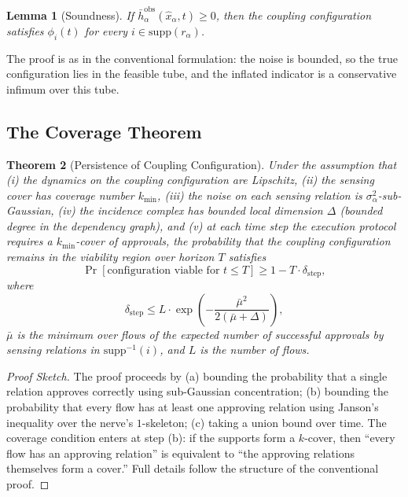 \documentclass[11pt]{article}
\newtheorem{theorem}{Theorem}[section]
\newtheorem{lemma}[theorem]{Lemma}
\theoremstyle{definition}
\theoremstyle{remark}
\begin{document}
\begin{lemma}[Soundness]
\label{lem:soundness}
If $\bar h_\alpha^{\mathrm{obs}}(\hat x_\alpha, t) \geq 0$, then the coupling configuration satisfies $\phi_i(t)$ for every $i \in \mathrm{supp}(r_\alpha)$.
\end{lemma}

The proof is as in the conventional formulation: the noise is bounded, so the true configuration lies in the feasible tube, and the inflated indicator is a conservative infimum over this tube.

\subsection{The Coverage Theorem}

\begin{theorem}[Persistence of Coupling Configuration]
\label{thm:persistence}
Under the assumption that (i) the dynamics on the coupling configuration are Lipschitz, (ii) the sensing cover has coverage number $k_{\min}$, (iii) the noise on each sensing relation is $\sigma_\alpha^2$-sub-Gaussian, (iv) the incidence complex has bounded local dimension $\Delta$ (bounded degree in the dependency graph), and (v) at each time step the execution protocol requires a $k_{\min}$-cover of approvals, the probability that the coupling configuration remains in the viability region over horizon $T$ satisfies
\begin{equation}
\Pr[\text{configuration viable for } t \leq T] \geq 1 - T \cdot \delta_{\mathrm{step}},
\end{equation}
where 
\begin{equation}
\delta_{\mathrm{step}} \leq L \cdot \exp\left(-\frac{\bar\mu^2}{2(\bar\mu + \Delta)}\right),
\end{equation}
$\bar\mu$ is the minimum over flows of the expected number of successful approvals by sensing relations in $\mathrm{supp}^{-1}(i)$, and $L$ is the number of flows.
\end{theorem}

\begin{proof}[Proof Sketch]
The proof proceeds by (a) bounding the probability that a single relation approves correctly using sub-Gaussian concentration; (b) bounding the probability that every flow has at least one approving relation using Janson's inequality over the nerve's $1$-skeleton; (c) taking a union bound over time. The coverage condition enters at step (b): if the supports form a $k$-cover, then ``every flow has an approving relation'' is equivalent to ``the approving relations themselves form a cover.'' Full details follow the structure of the conventional proof.
\end{proof}
\end{document}
